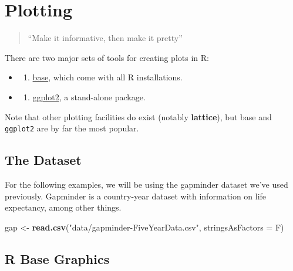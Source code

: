 \documentclass[]{book}
\newenvironment{Shaded}{\begin{snugshade}}{\end{snugshade}}
\newcommand{\KeywordTok}[1]{\textcolor[rgb]{0.13,0.29,0.53}{\textbf{#1}}}
\newcommand{\DataTypeTok}[1]{\textcolor[rgb]{0.13,0.29,0.53}{#1}}
\newcommand{\StringTok}[1]{\textcolor[rgb]{0.31,0.60,0.02}{#1}}
\newcommand{\NormalTok}[1]{#1}
\providecommand{\tightlist}{%
  \setlength{\itemsep}{0pt}\setlength{\parskip}{0pt}}
\begin{document}
\chapter{Plotting}\label{plotting}

\begin{quote}
``Make it informative, then make it pretty''
\end{quote}

There are two major sets of tools for creating plots in R:

\begin{itemize}
\item
  \begin{enumerate}
  \def\labelenumi{\arabic{enumi}.}
  \tightlist
  \item
    \protect\hyperlink{1-r-base-graphics}{base}, which come with all R
    installations.
  \end{enumerate}
\item
  \begin{enumerate}
  \def\labelenumi{\arabic{enumi}.}
  \setcounter{enumi}{1}
  \tightlist
  \item
    \protect\hyperlink{2-ggplot2}{ggplot2}, a stand-alone package.
  \end{enumerate}
\end{itemize}

Note that other plotting facilities do exist (notably \textbf{lattice}),
but base and \texttt{ggplot2} are by far the most popular.

\section{The Dataset}\label{the-dataset}

For the following examples, we will be using the gapminder dataset we've
used previously. Gapminder is a country-year dataset with information on
life expectancy, among other things.

\begin{Shaded}
\begin{Highlighting}[]
\NormalTok{gap <-}\StringTok{ }\KeywordTok{read.csv}\NormalTok{(}\StringTok{"data/gapminder-FiveYearData.csv"}\NormalTok{, }\DataTypeTok{stringsAsFactors =}\NormalTok{ F)}
\end{Highlighting}
\end{Shaded}

\section{R Base Graphics}\label{r-base-graphics}
\end{document}
